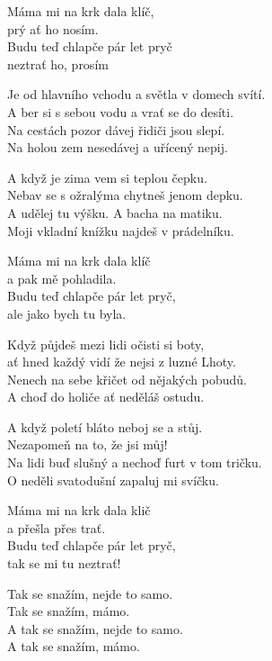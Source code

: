 
Máma mi na krk dala klíč,\\
prý ať ho nosím.\\
Budu teď chlapče pár let pryč\\
neztrať ho, prosím

\ve{}
Je od hlavního vchodu a světla v domech svítí.\\
A ber si s sebou vodu a vrať se do desíti.\\
Na cestách pozor dávej řidiči jsou slepí.\\
Na holou zem nesedávej a uřícený nepij.

\ve{}
A když je zima vem si teplou čepku.\\
Nebav se s ožralýma chytneš jenom depku.\\
A udělej tu výšku. A bacha na matiku.\\
Moji vkladní knížku najdeš v prádelníku.

Máma mi na krk dala klíč\\
a pak mě pohladila.\\
Budu teď chlapče pár let pryč,\\
ale jako bych tu byla.

\ve{}
Když půjdeš mezi lidi očisti si boty,\\
ať hned každý vidí že nejsi z luzné Lhoty.\\
Nenech na sebe křičet od nějakých pobudů.\\
A choď do holiče ať neděláš ostudu.

\ve{}
A když poletí bláto neboj se a stůj.\\
Nezapomeň na to, že jsi můj!\\
Na lidi buď slušný a nechoď furt v tom tričku.\\
O neděli svatodušní zapaluj mi svíčku.

Máma mi na krk dala klič\\
a přešla přes trať.\\
Budu teď chlapče pár let pryč,\\
tak se mi tu neztrať!

\ve{}
Tak se snažím, nejde to samo.\\
Tak se snažím, mámo.\\
A tak se snažím, nejde to samo.\\
A tak se snažím, mámo.

\esong{}